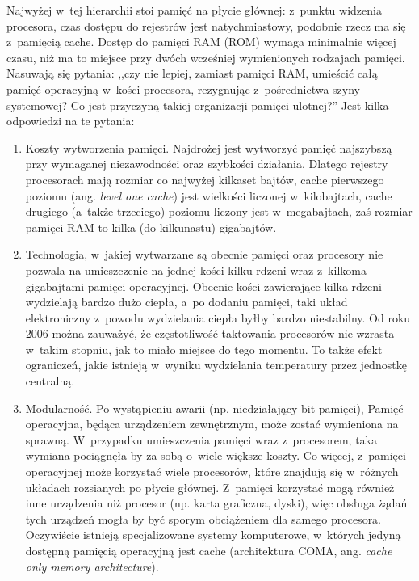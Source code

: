 \documentclass[12pt]{mwart}
\begin{document}
	Najwyżej w~tej hierarchii stoi pamięć na płycie głównej: z~punktu widzenia procesora, czas dostępu do rejestrów jest natychmiastowy,
	podobnie rzecz ma się z~pamięcią cache. Dostęp do pamięci RAM (ROM) wymaga minimalnie więcej czasu, niż ma to miejsce przy dwóch
	wcześniej wymienionych rodzajach pamięci. Nasuwają się pytania: ,,czy nie lepiej, zamiast pamięci RAM, umieścić całą
	pamięć operacyjną w~kości procesora, rezygnując z~pośrednictwa szyny systemowej\mbox{}? Co jest przyczyną takiej organizacji pamięci ulotnej\mbox{}?''
	Jest kilka odpowiedzi na te pytania:
	\begin{enumerate}
		\item Koszty wytworzenia pamięci. Najdrożej jest wytworzyć pamięć najszybszą przy wymaganej niezawodności oraz szybkości działania.
			Dlatego rejestry procesorach mają rozmiar co najwyżej kilkaset bajtów, cache pierwszego poziomu (ang. \emph{level one cache})
			jest wielkości liczonej w~kilobajtach, cache drugiego (a~także trzeciego) poziomu liczony jest w~megabajtach, zaś
			rozmiar pamięci RAM to kilka (do kilkunastu) gigabajtów.
		\item Technologia, w~jakiej wytwarzane są obecnie pamięci oraz procesory nie pozwala na umieszczenie na jednej kości kilku rdzeni
			wraz z~kilkoma gigabajtami pamięci operacyjnej. Obecnie kości zawierające kilka rdzeni wydzielają bardzo dużo ciepła, a~po dodaniu
			pamięci, taki układ elektroniczny z~powodu wydzielania ciepła byłby bardzo niestabilny. Od roku 2006 można zauważyć,
			że częstotliwość taktowania procesorów nie wzrasta w~takim stopniu, jak to miało miejsce do tego momentu. To także efekt ograniczeń,
			jakie istnieją w~wyniku wydzielania temperatury przez jednostkę centralną.
		\item Modularność. Po wystąpieniu awarii (np. niedziałający bit pamięci), Pamięć operacyjna, będąca urządzeniem zewnętrznym, może zostać
			wymieniona na sprawną. W~przypadku umieszczenia pamięci wraz z~procesorem, taka wymiana pociągnęła by za sobą o~wiele większe
			koszty. Co więcej, z~pamięci operacyjnej może korzystać wiele procesorów, które znajdują się w~różnych układach rozsianych po płycie głównej.
			Z~pamięci korzystać mogą również inne urządzenia niż procesor (np. karta graficzna, dyski), więc obsługa żądań tych urządzeń mogła by być
			sporym obciążeniem dla samego procesora. Oczywiście istnieją specjalizowane systemy komputerowe, w~których jedyną dostępną 
			pamięcią operacyjną jest cache (architektura COMA, ang. \emph{cache only memory architecture}).
	\end{enumerate}
\end{document}
